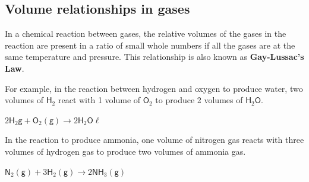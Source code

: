             \subsection*{Volume relationships in gases}
            \nopagebreak
      \label{m38711*id65179}In a chemical reaction between gases, the relative volumes of the gases in the reaction are present in a ratio of small whole numbers if all the gases are at the same temperature and pressure. This relationship is also known as \textbf{Gay-Lussac's Law}.\par 
      \label{m38711*id65189}For example, in the reaction between hydrogen and oxygen to produce water, two volumes of $\mathsf{H}{}_{2}$ react with 1 volume of $\mathsf{O}{}_{2}$ to produce 2 volumes of $\mathsf{H}{}_{2}\mathsf{O}$.\par 
      \label{m38711*id65237}$2\mathsf{H}_{2}\mathsf{g} +\mathsf{O}_{2} \mathsf{(g)} \to 2\mathsf{H}_{2}\mathsf{O} \mathsf{\ell}$\par 
      \label{m38711*id65282}In the reaction to produce ammonia, one volume of nitrogen gas reacts with three volumes of hydrogen gas to produce two volumes of ammonia gas.\par 
      \label{m38711*id65286}$\mathsf{N}_{2} \mathsf{(g)}+3\mathsf{H}_{2} \mathsf{(g)} \to 2\mathsf{NH}_{3} \mathsf{(g)}$
      \par  
    \label{m38711*cid8}

